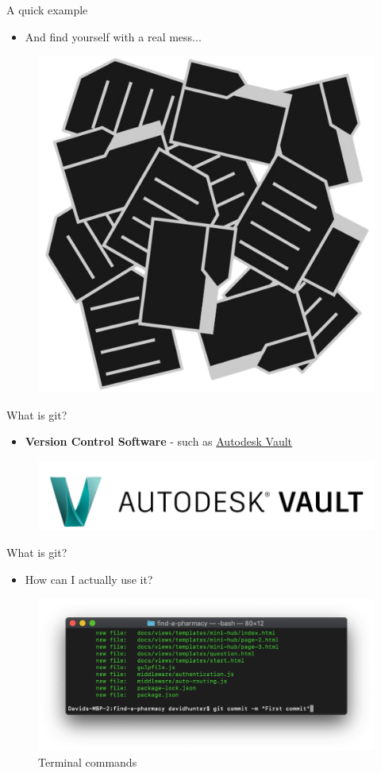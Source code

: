 \begin{frame}{A quick example}
\begin{itemize}
    \item And find yourself with a real mess...
\end{itemize}

\begin{figure}
    \centering
    \includegraphics[width=0.35\linewidth]{assets/pure_chaos_nobg.png}
    \label{fig:pure_chaos}
\end{figure}

\end{frame}

\begin{frame}{What is git?}
\begin{itemize}
    \item \textbf{Version Control Software} - such as \href{https://help.autodesk.com/view/VAULT/2023/ENU/?guid=GUID-87D9CA09-9881-4506-9465-0677392BCD7E}{Autodesk Vault}
\end{itemize}

\begin{figure}
    \centering
    \includegraphics[width=0.70\linewidth]{assets/vault.png}
\end{figure}
    
\end{frame}

\begin{frame}{What is git?}

\begin{itemize}
    \item How can I actually use it?
\end{itemize}


\begin{figure}
    \centering
    \includegraphics[width=0.70\linewidth]{assets/bash_commands.png}
    \caption{Terminal commands}
    \label{fig:terminal}
\end{figure}

\end{frame}


